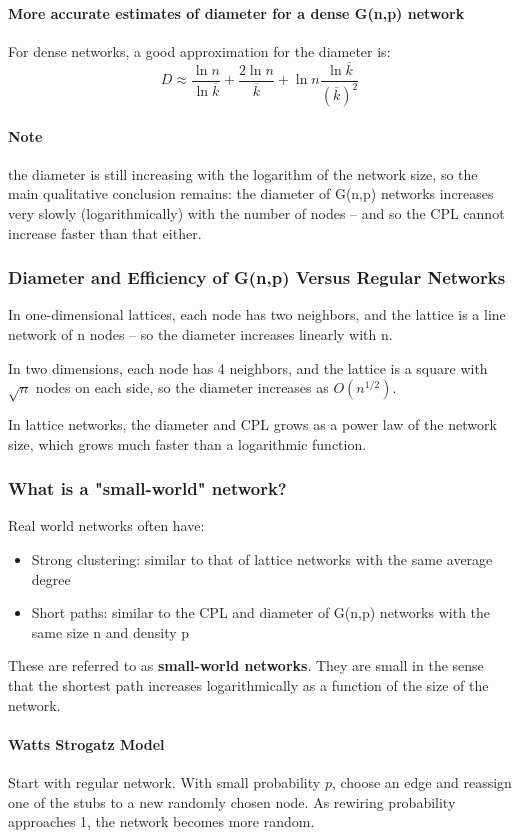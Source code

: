 \documentclass[11pt]{scrartcl} %
\begin{document}
\paragraph{More accurate estimates of diameter for a dense G(n,p) network}
For dense networks, a good approximation for the diameter is:
\[ D \approx \frac{\ln n}{\ln \overline{k}} + \frac{2 \ln n}{\overline{k}} + \ln n \frac{\ln \overline{k}}{(\overline{k})^2 } \]

\paragraph{Note} the diameter is still increasing with the logarithm of the network size, so the main qualitative conclusion remains: the diameter of G(n,p) networks increases very slowly (logarithmically) with the number of nodes – and so the CPL cannot increase faster than that either.

\subsubsection{Diameter and Efficiency of G(n,p) Versus Regular Networks}
In one-dimensional lattices, each node has two neighbors, and the lattice is a line network of n nodes -- so the diameter increases linearly with n.

In two dimensions, each node has 4 neighbors, and the lattice is a square with $\sqrt{n}$ nodes on each side, so the diameter increases as $O(n^{1/2})$.

In lattice networks, the diameter and CPL grows as a power law of the network size, which grows much faster than a logarithmic function.

\subsubsection{What is a "small-world" network?}
Real world networks often have:
\begin{itemize}
	\item Strong clustering: similar to that of lattice networks with the same average degree
	\item Short paths: similar to the CPL and diameter of G(n,p) networks with the same size n and density p
\end{itemize}
These are referred to as \textbf{small-world networks}. They are small in the sense that the shortest path increases logarithmically as a function of the size of the network.

\paragraph{Watts Strogatz Model} 
Start with regular network. With small probability $p$, choose an edge and reassign one of the stubs to a new randomly chosen node. As rewiring probability approaches 1, the network becomes more random.
\end{document}
